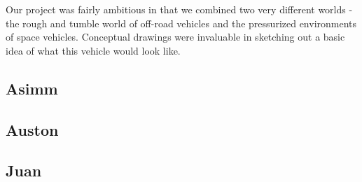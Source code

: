 Our project was fairly ambitious in that we combined two very different worlds - the rough and tumble world of off-road vehicles and the pressurized environments of space vehicles. Conceptual drawings were invaluable in sketching out a basic idea of what this vehicle would look like.

\newcommand{\Conceptual}[1]{
 \subsection{#1}
  
}

\Conceptual{Asimm}
\Conceptual{Auston}
\Conceptual{Juan}
